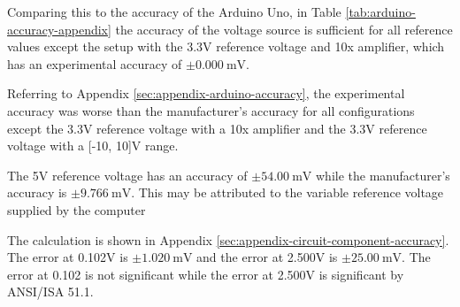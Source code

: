 Comparing this to the accuracy of the Arduino Uno, in Table \ref{tab:arduino-accuracy-appendix} the accuracy of 
the voltage source is sufficient for all reference values except the setup with the 3.3V reference voltage and 10x amplifier, which has an experimental accuracy of $\pm\qty{0.000}{\milli\volt}$.


\noindent Referring to Appendix \ref{sec:appendix-arduino-accuracy}, the experimental accuracy was worse than the manufacturer's accuracy for all configurations 
except the 3.3V reference voltage with a 10x amplifier and the 3.3V reference voltage with a [-10, 10]V range.

The 5V reference voltage has an accuracy of $\pm\qty{54.00}{\milli\volt}$ while the manufacturer's accuracy is $\pm \qty{9.766}{\milli\volt}$. This may be attributed 
to the variable reference voltage supplied by the computer



\noindent The calculation is shown in Appendix \ref{sec:appendix-circuit-component-accuracy}. The error at 0.102V is $\pm \qty{1.020}{\milli\volt}$ and the error at 2.500V is $\pm \qty{25.00}{\milli\volt}$. The error at 0.102 
is not significant while the error at 2.500V is significant by ANSI/ISA 51.1.

